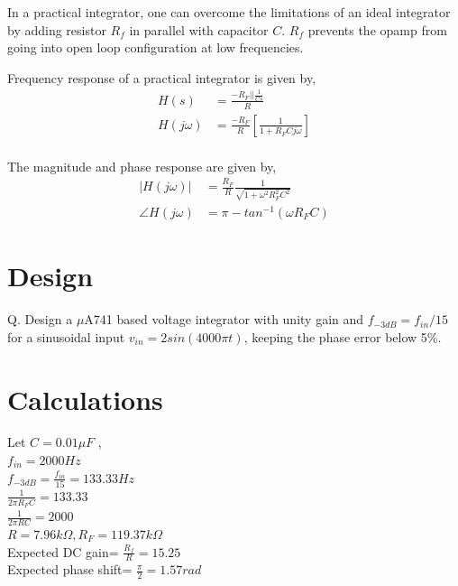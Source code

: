 \documentclass[12pt, titlepage]{article}
\theoremstyle{definition}
\begin{document}
    In a practical integrator, one can overcome the limitations of an ideal integrator by adding resistor $R_{f}$ in parallel with capacitor $C$.
    $R_{f}$ prevents the opamp from going into open loop configuration at low frequencies.

    Frequency response of a practical integrator is given by,
    \begin{align*}
      H(s) &= \frac{-R_{F} || \frac{1}{Cs}}{R} \\
      H(j\omega) &= \frac{-R_{F}}{R} \left[ \frac{1}{1+R_{F}Cj\omega} \right] \\
    \end{align*}

    The magnitude and phase response are given by,
    \begin{align*}
    |H(j\omega)| &= \frac{R_{F}}{R}\frac{1}{\sqrt{1+\omega^{2}R_{F}^{2}C^{2}}} \\
    \angle H(j\omega) &= \pi - tan^{-1}(\omega R_{F}C)
    \end{align*}


  \newpage
  \section{Design}
    Q. Design a $\mu$A741 based voltage integrator with unity gain and
    $f_{-3dB} = f_{in}/15$ for a sinusoidal input
    $v_{in} = 2 sin(4000\pi t)$, keeping the phase error below 5\%.


  \section{Calculations}
    Let $C=0.01\mu F$ , \\
    $f_{in}=2000 Hz$\\
    $f_{-3dB}=\frac{f_{in}}{15} = 133.33 Hz$ \\
    $\frac{1}{2\pi R_{F}C} = 133.33$\\
    $\frac{1}{2\pi RC} = 2000$\\
    $R=7.96k\Omega, R_{F}=119.37k\Omega$\\
    Expected DC gain= $\frac{R_{f}}{R}=15.25$\\
    Expected phase shift= $\frac{\pi}{2}=1.57 rad$


  \newpage
\end{document}
